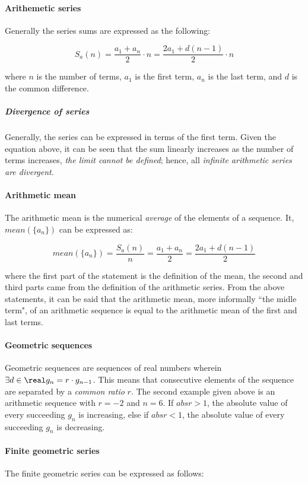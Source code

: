 \paragraph{Arithemetic series}
Generally the series sums are expressed as the following:

\[
  S_a(n) = \dfrac{a_1 + a_n}{2}\cdot n = \dfrac{2a_1 + d(n-1)}{2}\cdot n
\]

where $n$ is the number of terms, $a_1$ is the first term, $a_n$ is the last term, and $d$ is the common difference.

\subparagraph{Divergence of series}
Generally, the series can be expressed in terms of the first term.
Given the equation above, it can be seen that the sum linearly increases as the number of terms increases, \emph{the limit cannot be defined}; hence, all \emph{infinite arithmetic series are divergent}.

\paragraph{Arithmetic mean}
The arithmetic mean is the numerical \emph{average} of the elements of a sequence.
It, $mean(\{ a_n\})$ can be expressed as:

\[
  mean(\{ a_n\}) = \dfrac{S_a(n)}{n} = \dfrac{a_1 + a_n}{2} = \dfrac{2a_1 + d(n-1)}{2}
\]

where the first part of the statement is the definition of the mean, the second and third parts came from the definition of the arithmetic series.
From the above statements, it can be said that the arithmetic mean, more informally ``the midle term", of an arithmetic sequence is equal to the arithmetic mean of the first and last terms.

\paragraph{Geometric sequences}
Geometric sequences are sequences of real numbers wherein $\exists d \in \real g_n = r\cdot g_{n-1}$.
This means that consecutive elements of the sequence are separated by a \emph{common ratio} $r$.
The second example given above is an arithmetic sequence with $r = -2$ and $n = 6$.
If $abs{r} > 1$, the absolute value of every succeeding $g_n$ is increasing, else if $abs{r} < 1$, the absolute value of every succeeding $g_n$ is decreasing.

\paragraph{Finite geometric series}
The finite geometric series can be expressed as follows:

